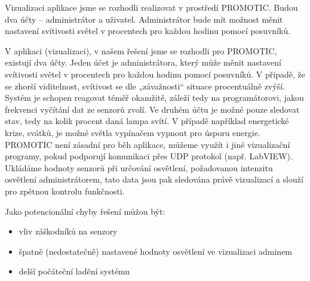 Vizualizaci aplikace jsme se rozhodli realizovat v prostředí PROMOTIC. Budou dva účty -- administrátor a uživatel. Administrátor bude mít možnost měnit nastavení svítivosti světel v procentech pro každou hodinu pomocí posuvníků.

V aplikaci (vizualizaci), v našem řešení jsme se rozhodli pro PROMOTIC, existují dva účty. Jeden účet je administrátora, který může měnit nastavení svítivosti světel v procentech pro každou hodinu pomocí posuvníků. V případě, že se zhorší viditelnost, svítivost se dle „závažnosti“ situace procentuálně zvýší. Systém je schopen reagovat téměř okamžitě, záleží tedy na programátorovi, jakou frekvenci vyčítání dat ze senzorů zvolí. Ve druhém účtu je možné pouze sledovat stav, tedy na kolik procent daná lampa svítí. V případě například energetické krize, svátků, je možné světla vypínačem vypnout pro úsporu energie. PROMOTIC není zásadní pro běh aplikace, můžeme využít i jiné vizualizační programy, pokud podporují komunikaci přes UDP protokol (např. LabVIEW). Ukládáme hodnoty senzorů při určování osvětlení, požadovanou intenzitu osvětlení administrátorem, tato data jsou pak sledována právě vizualizací a slouží pro zpětnou kontrolu funkčnosti. 


Jako potencionální chyby řešení můžou být: 
\begin{itemize}
    \item vliv záškodníků na senzory
    \item špatně (nedostatečně) nastavené hodnoty osvětlení ve vizualizaci adminem
    \item delší počáteční ladění systému
\end{itemize}




\endinput
